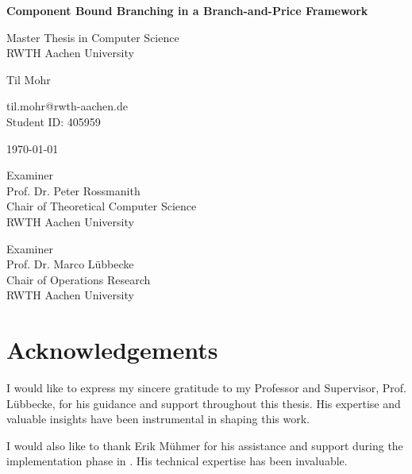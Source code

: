 \documentclass[
	12pt, %
	a4paper, %
	twoside, %
]{report}
\begin{document}
\begin{titlepage}
	\centering
	{\Huge\bfseries Component Bound Branching in a Branch-and-Price Framework\par}
	\vspace{0.85cm}
	{\LARGE Master Thesis in Computer Science\\RWTH Aachen University\par}
	\vspace{2cm}
	{\LARGE Til Mohr\par}
	\vspace{0.5cm}
	{\large til.mohr@rwth-aachen.de\\Student ID: 405959\par}
	\vspace{2cm}
	{\large \today\par}
	\vspace{2cm}
	\begin{minipage}{0.48\textwidth}
		\centering
		 Examiner\\
		Prof. Dr. Peter Rossmanith\\
		Chair of Theoretical Computer Science\\
		RWTH Aachen University
	\end{minipage}
	\begin{minipage}{0.48\textwidth}
		\centering
		 Examiner\\
		Prof. Dr. Marco Lübbecke\\
		Chair of Operations Research\\
		RWTH Aachen University
	\end{minipage}
\end{titlepage}

\cleardoublepage



\cleardoublepage

\section*{Acknowledgements}
I would like to express my sincere gratitude to my Professor and Supervisor, Prof. Lübbecke, for his guidance and support throughout this thesis. His expertise and valuable insights have been instrumental in shaping this work.

I would also like to thank Erik Mühmer for his assistance and support during the implementation phase in \GCG{}. His technical expertise has been invaluable.
\end{document}
